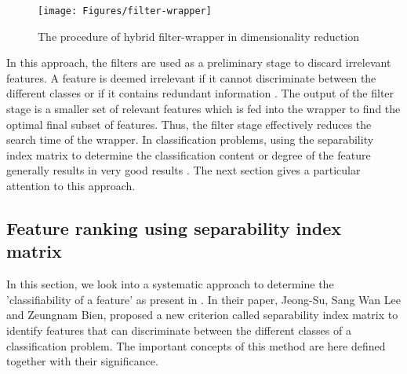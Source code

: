 \begin{figure}[ht!]
	\centering
	\texttt{[image: Figures/filter-wrapper]}
	\caption{The procedure of hybrid filter-wrapper in dimensionality reduction}{\cite{hybr2011}}
	\label{fig:filt-wrap}
\end{figure}
In this approach, the filters are used as a preliminary stage to discard irrelevant features. A feature is deemed irrelevant if it cannot discriminate between the different classes or if it contains redundant information \cite{hybr2011}.
The output of the filter stage is a smaller set of relevant features which is fed into the wrapper to find the optimal final subset of features. Thus, the filter stage effectively reduces the search time of the wrapper. 
In classification problems, using the separability index matrix to determine the classification content or degree of the feature generally results in very good results \cite{sima2013}. 
The next section gives a particular attention to this approach.

\subsection{Feature ranking using separability index matrix}
In this section, we look into a systematic approach to determine the 'classifiability of a feature' as present in \cite{sima2013}.
In their paper, Jeong-Su, Sang Wan Lee and Zeungnam Bien, proposed a new criterion called separability index matrix to identify features that can discriminate between the different classes of a classification problem.
The important concepts of this method are here defined together with their significance.\\\\

